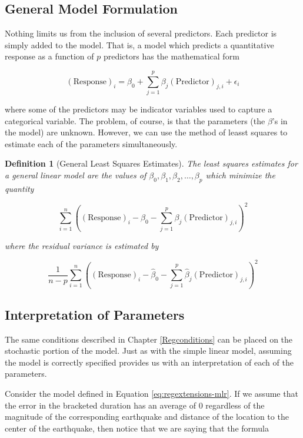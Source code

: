 \documentclass[
]{book}
\theoremstyle{plain}
\theoremstyle{mydefn}
\newtheorem{definition}{Definition}[chapter]
\theoremstyle{myexmpl}
\theoremstyle{remark}
\begin{document}
\hypertarget{general-model-formulation}{%
\subsection{General Model Formulation}\label{general-model-formulation}}

Nothing limits us from the inclusion of several predictors. Each predictor is simply added to the model. That is, a model which predicts a quantitative response as a function of \(p\) predictors has the mathematical form

\[(\text{Response})_i = \beta_0 + \sum_{j=1}^{p} \beta_j (\text{Predictor})_{j,i} + \epsilon_i\]

where some of the predictors may be indicator variables used to capture a categorical variable. The problem, of course, is that the parameters (the \(\beta\)'s in the model) are unknown. However, we can use the method of leasst squares to estimate each of the parameters simultaneously.

\begin{definition}[General Least Squares Estimates]
\protect\hypertarget{def:defn-mlr-least-squares-estimates}{}{\label{def:defn-mlr-least-squares-estimates} {} }The least squares estimates for a general linear model are the values of \(\beta_0, \beta_1, \beta_2, \dotsc, \beta_p\) which minimize the quantity

\[\sum_{i=1}^n \left((\text{Response})_i - \beta_0 - \sum_{j=1}^{p} \beta_j(\text{Predictor})_{j,i}\right)^2\]

where the residual variance is estimated by

\[\frac{1}{n-p} \sum_{i=1}^n \left((\text{Response})_i - \widehat{\beta}_0 - \sum_{j=1}^{p} \widehat{\beta}_j(\text{Predictor})_{j,i}\right)^2\]
\end{definition}

\hypertarget{interpretation-of-parameters}{%
\subsection{Interpretation of Parameters}\label{interpretation-of-parameters}}

The same conditions described in Chapter \ref{Regconditions} can be placed on the stochastic portion of the model. Just as with the simple linear model, assuming the model is correctly specified provides us with an interpretation of each of the parameters.

Consider the model defined in Equation \eqref{eq:regextensions-mlr}. If we assume that the error in the bracketed duration has an average of 0 regardless of the magnitude of the corresponding earthquake and distance of the location to the center of the earthquake, then notice that we are saying that the formula
\end{document}

